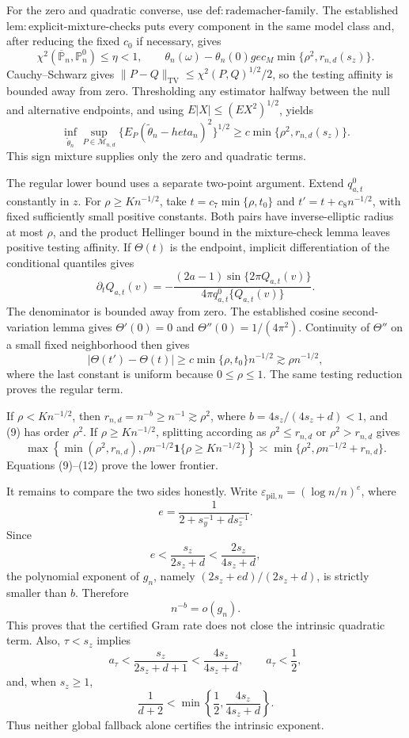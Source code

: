 For the zero and quadratic converse, use \(\mathrm{def{:}rademacher\text{-}family}\). The established \(\mathrm{lem{:}explicit\text{-}mixture\text{-}checks}\) puts every component in the same model class and, after reducing the fixed \(c_0\) if necessary, gives
\[
\chi^2(\overline{\mathbb P}_n,\mathbb P_n^0)\le\eta<1,
\qquad
\theta_n(\omega)-\theta_n(0)ge c_M\min\{\rho^2,r_{n,d}(s_z)\}. \tag{8}
\]
Cauchy--Schwarz gives \(\|P-Q\|_{\mathrm{TV}}\le\chi^2(P,Q)^{1/2}/2\), so the testing affinity is bounded away from zero. Thresholding any estimator halfway between the null and alternative endpoints, and using \(E|X|\le(E X^2)^{1/2}\), yields
\[
\inf_{\widetilde\theta_n}\sup_{P\in\mathcal M_{n,d}}
\{E_P(\widetilde\theta_n-  heta_n)^2\}^{1/2}
\ge c\min\{\rho^2,r_{n,d}(s_z)\}.                               \tag{9}
\]
This sign mixture supplies only the zero and quadratic terms.

The regular lower bound uses a separate two-point argument. Extend \(q_{a,t}^{0}\) constantly in \(z\). For \(\rho\ge K n^{-1/2}\), take \(t=c_7\min\{\rho,t_0\}\) and \(t'=t+c_8n^{-1/2}\), with fixed sufficiently small positive constants. Both pairs have inverse-elliptic radius at most \(\rho\), and the product Hellinger bound in the mixture-check lemma leaves positive testing affinity. If \(\Theta(t)\) is the endpoint, implicit differentiation of the conditional quantiles gives
\[
\partial_tQ_{a,t}(v)
=-\frac{(2a-1)\sin\{2\pi Q_{a,t}(v)\}}
{4\pi q_{a,t}^{0}\{Q_{a,t}(v)\}}.                               \tag{10}
\]
The denominator is bounded away from zero. The established cosine second-variation lemma gives \(\Theta'(0)=0\) and \(\Theta''(0)=1/(4\pi^2)\). Continuity of \(\Theta''\) on a small fixed neighborhood then gives
\[
|\Theta(t')-\Theta(t)|\ge c\min\{\rho,t_0\}n^{-1/2}
\gtrsim\rho n^{-1/2},                                           \tag{11}
\]
where the last constant is uniform because \(0\le\rho\le1\). The same testing reduction proves the regular term.

If \(\rho<K n^{-1/2}\), then \(r_{n,d}=n^{-b}\ge n^{-1}\gtrsim\rho^2\), where \(b=4s_z/(4s_z+d)<1\), and (9) has order \(\rho^2\). If \(\rho\ge K n^{-1/2}\), splitting according as \(\rho^2\le r_{n,d}\) or \(\rho^2>r_{n,d}\) gives
\[
\max\!\left\{\min(\rho^2,r_{n,d}),
\rho n^{-1/2}\mathbf1\{\rho\ge Kn^{-1/2}\}\right\}
\asymp\min\{\rho^2,\rho n^{-1/2}+r_{n,d}\}.                   \tag{12}
\]
Equations (9)--(12) prove the lower frontier.

It remains to compare the two sides honestly. Write \(\varepsilon_{\mathrm{pil},n}=(\log n/n)^e\), where
\[
e=\frac1{2+s_y^{-1}+ds_z^{-1}}.
\]
Since
\[
e<\frac{s_z}{2s_z+d}<\frac{2s_z}{4s_z+d},                       \tag{13}
\]
the polynomial exponent of \(g_n\), namely \((2s_z+ed)/(2s_z+d)\), is strictly smaller than \(b\). Therefore
\[
n^{-b}=o(g_n).                                                    \tag{14}
\]
This proves that the certified Gram rate does not close the intrinsic quadratic term. Also, \(\tau<s_z\) implies
\[
a_\tau<\frac{s_z}{2s_z+d+1}<\frac{4s_z}{4s_z+d},
\qquad a_\tau<\frac12,                                          \tag{15}
\]
and, when \(s_z\ge1\),
\[
\frac1{d+2}<\min\!\left\{\frac12,\frac{4s_z}{4s_z+d}\right\}. \tag{16}
\]
Thus neither global fallback alone certifies the intrinsic exponent.

